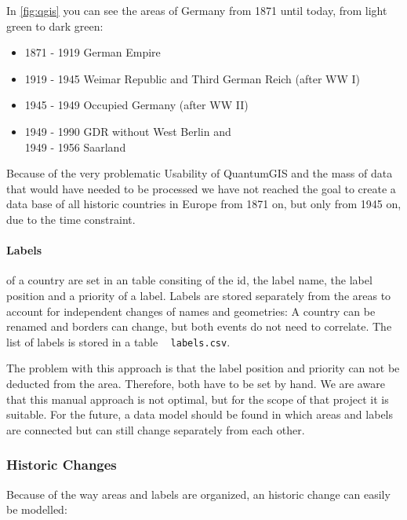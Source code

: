 In \ref{fig:qgis} you can see the areas of Germany from 1871 until today, from light green to dark green:

\begin{itemize}
  \item 1871 - 1919 German Empire
  \item 1919 - 1945 Weimar Republic and Third German Reich (after WW I)
  \item 1945 - 1949 Occupied Germany (after WW II)
  \item 1949 - 1990 GDR without West Berlin and \\
        1949 - 1956 Saarland
\end{itemize}

Because of the very problematic Usability of QuantumGIS and the mass of data that would have needed to be processed we have not reached the goal to create a data base of all historic countries in Europe from 1871 on, but only from 1945 on, due to the time constraint.

\paragraph{Labels} %
\label{par:labels}

of a country are set in an table consiting of the id, the label name, the label position and a priority of a label. Labels are stored separately from the areas to account for independent changes of names and geometries: A country can be renamed and borders can change, but both events do not need to correlate. The list of labels is stored in a table ~ \texttt{labels.csv}.

The problem with this approach is that the label position and priority can not be deducted from the area. Therefore, both have to be set by hand. We are aware that this manual approach is not optimal, but for the scope of that project it is suitable. For the future, a data model should be found in which areas and labels are connected but can still change separately from each other.



\subsubsection{Historic Changes} %
\label{ssub:historic_changes}
Because of the way areas and labels are organized, an historic change can easily be modelled:

